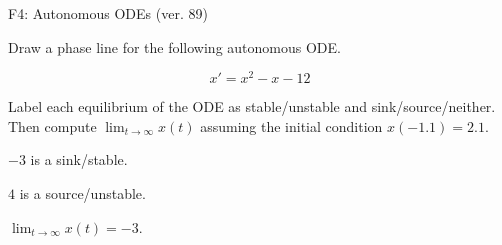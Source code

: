 \begin{exercise}
  \begin{exerciseTitle}F4: Autonomous ODEs (ver. 89)\end{exerciseTitle}
  \begin{exerciseStatement}
    

      Draw a phase line for the following 
      autonomous ODE.
    

    
\[x'= x^{2} - x - 12\]

    

      Label each equilibrium of the ODE
      as stable/unstable and sink/source/neither.
      Then compute \(\lim_{t\to\infty}x(t)\)
      assuming the initial condition
      \(x( -1.1 )= 2.1\).
    

  \end{exerciseStatement}
  \begin{exerciseAnswer}
    

      \(-3\) is a sink/stable.
      
      \(4\) is a source/unstable.
    

    

      \(\lim_{t\to\infty}x(t)=-3\).
    

  \end{exerciseAnswer}
\end{exercise}
